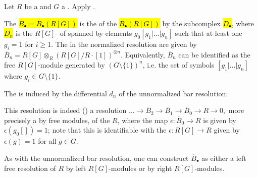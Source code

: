 \begin{definition} \label{definition:normalized_bar_resolution_of_a_ring_over_a_group_algebra}
Let $R$ be a  and $G$ a . Apply .

The  \hl{$\overline{B}_\bullet = \overline{B}_{\bullet}(R[G])$} is the  of the  \hl{$B_{\bullet}(R[G])$} by the subcomplex \hl{$D_{\bullet}$}, where \hl{$D_n$} is the $R[G]$- of  spanned by elements $g_0[g_1 | \dots | g_n]$ such that at least one $g_i = 1$ for $i \geq 1$. The  in the normalized resolution are given by $\overline{B}_n = R[G] \otimes_R (R[G] / R \cdot [1])^{\otimes n}$. Equivalently, $\overline{B}_n$ can be identified as the free $R[G]$-module generated by $(G \setminus \{1\})^n$, i.e. the set of symbols $[g_1 | \dots | g_n]$ where $g_i \in G \setminus \{1\}$.

The  is induced by the differential $d_n$ of the unnormalized bar resolution.

This resolution is indeed () a resolution
$\dots \to \overline{B}_2 \to \overline{B}_1 \to \overline{B}_0 \to R \to 0,$
more precisely a  by free modules, of the  $R$, where the map $\epsilon: \overline{B}_0 \to R$ is given by $\epsilon(g_0[]) = 1$; note that this is identifiable with the  $\epsilon: R[G] \to R$ given by $\epsilon(g) = 1$ for all $g \in G$.

As with the unnormalized bar resolution, one can construct $\overline{B}_\bullet$ as either a left free resolution of $R$ by left $R[G]$-modules or by right $R[G]$-modules.
\end{definition}
